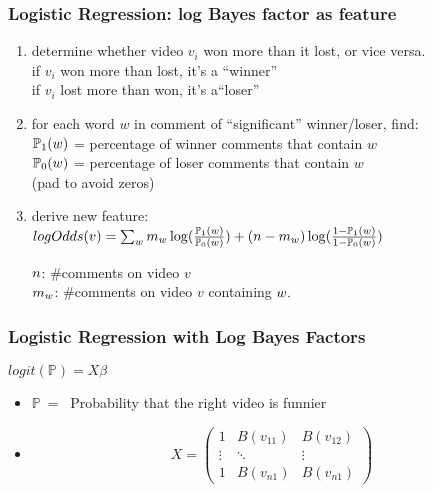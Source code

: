 \documentclass[fleqn]{beamer}
\begin{document}
\begin{frame}
\frametitle{Logistic Regression: log Bayes factor as feature}	

      \begin{enumerate}\vspace{2mm}
      \item determine whether video $v_i$ won more than it lost, or vice versa.\\
               if $v_i$ won more than lost, it's a ``winner''\\
               if $v_i$ lost more than won, it's a``loser''
               \vspace{2mm}
      \item for each word $w$ in comment of ``significant'' winner/loser, find: \\
              $\mathbb{P}_1(\mathnormal{w})$ 
             = percentage of winner comments that contain $w$\\
             $\mathbb{P}_0(\mathnormal{w})$ = 
               percentage of loser comments that contain $w$\\
               (pad to avoid zeros)\\
               \vspace{2mm}
      \item derive new feature: \\      
$logOdds(v) =\sum_{\mathnormal{w}} \mathnormal{m_w}\log(\frac{\mathbb{P}_1(\mathnormal{w})}{\mathbb{P}_0(\mathnormal{w})}) + (\mathnormal{n-m_w})\log(\frac{1-\mathbb{P}_1(\mathnormal{w})}{1-\mathbb{P}_0(\mathnormal{w})})$\vspace{3mm}

$\mathnormal{n}$: \#comments on video $v$\\
$\mathnormal{m_w}$: \#comments on video $v$ containing $\mathnormal{w}.$  \vspace{3mm}
      \end{enumerate}

\end{frame}

\begin{frame}
\frametitle{Logistic Regression with Log Bayes Factors}
\begin{center}
$logit(\mathbb{P})=X\beta$
\end{center}
    \begin{itemize}
        \item $\mathbb{P}$\ = \ Probability that the right video is funnier
       \item   \[ X = \left( \begin{array} {ccc}
		     1 & B(v_{11}) & B(v_{12})\\
		      \vdots & \ddots & \vdots \\
		      1 & B(v_{n1}) & B(v_{n1})
		     \end{array} \right)
	 	 \]
       

    \end{itemize}
\end{frame}
\end{document}
